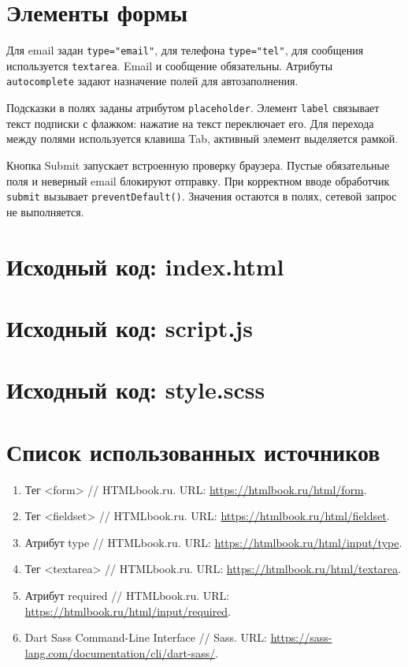 \documentclass[14pt,a4paper]{extarticle}
\newcommand{\code}[1]{{\fontsize{12}{14}\selectfont\texttt{#1}}}
\newcommand{\listing}[1]{\begingroup\singlespacing\setlength{\topsep}{0pt}\setlength{\partopsep}{0pt}\endgroup}
\begin{document}
\clearpage
\section{Элементы формы}
Для email задан \code{type="email"}, для телефона \code{type="tel"}, для сообщения используется \code{textarea}. Email и сообщение обязательны. Атрибуты \code{autocomplete} задают назначение полей для автозаполнения.

Подсказки в полях заданы атрибутом \code{placeholder}. Элемент \code{label} связывает текст подписки с флажком: нажатие на текст переключает его. Для перехода между полями используется клавиша Tab, активный элемент выделяется рамкой.

Кнопка Submit запускает встроенную проверку браузера. Пустые обязательные поля и неверный email блокируют отправку. При корректном вводе обработчик \code{submit} вызывает \code{preventDefault()}. Значения остаются в полях, сетевой запрос не выполняется.


\clearpage
\section{Исходный код: index.html}
\listing{index.html}

\vspace{4mm}
\noindent\begin{minipage}{\textwidth}
\section{Исходный код: script.js}
\listing{script.js}
\end{minipage}

\clearpage
\section{Исходный код: style.scss}
\listing{style.scss}

\clearpage
\section*{Список использованных источников}
\begin{enumerate}[label=\arabic*.,leftmargin=8mm,itemsep=8pt,parsep=0pt]
\item Тег <form> // HTMLbook.ru. URL: \url{https://htmlbook.ru/html/form}.
\item Тег <fieldset> // HTMLbook.ru. URL: \url{https://htmlbook.ru/html/fieldset}.
\item Атрибут type // HTMLbook.ru. URL: \url{https://htmlbook.ru/html/input/type}.
\item Тег <textarea> // HTMLbook.ru. URL: \url{https://htmlbook.ru/html/textarea}.
\item Атрибут required // HTMLbook.ru. URL: \url{https://htmlbook.ru/html/input/required}.
\item Dart Sass Command-Line Interface // Sass. URL: \url{https://sass-lang.com/documentation/cli/dart-sass/}.
\end{enumerate}
\end{document}
